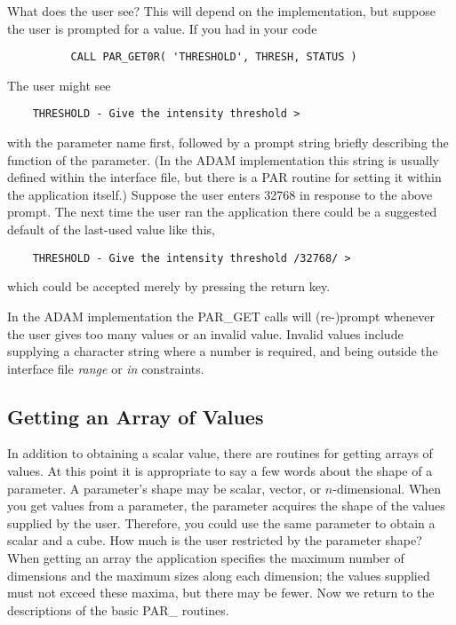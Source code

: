 \documentclass[twoside,11pt]{article}
\newcommand{\xlabel}[1]{}
\begin{document}
What does the user see?  This will depend on the implementation, but
suppose the user is prompted for a value.  If you had in your code 

\begin{verbatim}
          CALL PAR_GET0R( 'THRESHOLD', THRESH, STATUS )
\end{verbatim}

The user might see

\begin{verbatim}
    THRESHOLD - Give the intensity threshold >
\end{verbatim}

with the parameter name first, followed by a prompt string briefly
describing the function of the parameter.  (In the {\footnotesize ADAM}
implementation this string is usually defined within the interface file,
but there is a PAR routine for setting it within the application
itself.)  Suppose the user enters 32768 in response to the above prompt.
The next time the user ran the application there could be a suggested
default of the last-used value like this, 

\begin{verbatim}
    THRESHOLD - Give the intensity threshold /32768/ >
\end{verbatim}

which could be accepted merely by pressing the return key.

In the {\footnotesize ADAM} implementation the PAR\_GET calls will
(re-)prompt whenever the user gives too many values or an invalid value.
Invalid values include supplying a character string where a number is
required, and being outside the interface file {\em range\/} or
{\em in\/} constraints.

\subsection{\xlabel{getting_an_array_of_values}Getting an Array of Values}

In addition to obtaining a scalar value, there are routines for getting
arrays of values.  At this point it is appropriate to say a few words
about the shape of a parameter.  A parameter's shape may be scalar,
vector, or $n$-dimensional.  When you get values from a parameter, the
parameter acquires the shape of the values supplied by the user.
Therefore, you could use the same parameter to obtain a scalar and a
cube.  How much is the user restricted by the parameter shape?  When
getting an array the application specifies the maximum number of
dimensions and the maximum sizes along each dimension; the values
supplied must not exceed these maxima, but there may be fewer.  Now we
return to the descriptions of the basic PAR\_ routines. 
\end{document}
